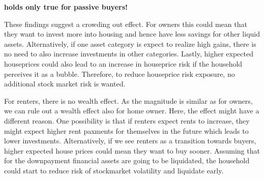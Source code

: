 \documentclass[ProjectABM]{subfiles}
\begin{document}





\textbf{holds only true for passive buyers!}

These findings suggest a crowding out effect. For owners this could mean that they want to invest more into housing and hence have less savings for other liquid assets. Alternatively, if one asset category is expect to realize high gains, there is no need to also increase investments in other categories. Lastly, higher expected houseprices could also lead to an increase in houseprice risk if the household perceives it as a bubble. Therefore, to reduce houseprice risk exposure, no additional stock market risk is wanted.

For renters, there is no wealth effect. As the magnitude is similar as for owners, we can rule out a wealth effect also for home owner. Here, the effect might have a different reason. One possibility is that if renters expect rents to increase, they might expect higher rent paxments for themselves in the future which leads to lower investments. Alternatively, if we see renters as a transition towards buyers, higher expected house prices could mean they want to buy sooner. Assuming that for the downpayment financial assets are going to be liquidated, the household could start to reduce risk of stockmarket volatility and liquidate early.







\end{document}
